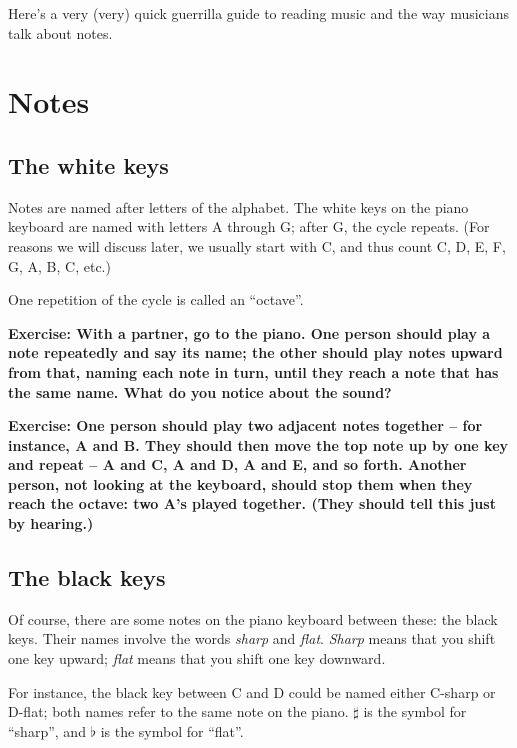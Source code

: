 \documentclass[10pt]{article}
\begin{document}
Here's a very (very) quick guerrilla guide to reading music and the way musicians talk about notes.

\section {Notes}

\subsection{The white keys}

Notes are named after letters of the alphabet. The white keys on the piano keyboard are named with letters
A through G; after G, the cycle repeats. (For reasons we will discuss later, we usually start with C, and thus count
C, D, E, F, G, A, B, C, etc.)

One repetition of the cycle is called an ``octave''.



{\bf Exercise: With a partner, go to the piano. One person should play a note repeatedly and say its name; the other should 
play notes upward from that, naming each note in turn, until they reach a note that has the same name. What do you 
notice about the sound?}

\vspace{1in}

{\bf Exercise: One person should play two adjacent notes together -- for instance, A and B. They should then move the 
top note up by one key and repeat -- A and C, A and D, A and E, and so forth. Another person, not looking at the keyboard,
should stop them when they reach the octave: two A's played together. (They should tell this just by hearing.)}

\vspace{1in}


\subsection{The black keys}

Of course, there are some notes on the piano keyboard between these: the black keys. Their names involve the 
words {\it sharp} and {\it flat}. {\it Sharp} means that you shift one key upward; {\it flat} 
means that you shift one key downward.

For instance, the black key between C and D could be named either C-sharp or D-flat; both names refer to the same note
on the piano. $\sharp$ is the symbol for ``sharp'', and $\flat$ is the symbol for ``flat''.
\end{document}
